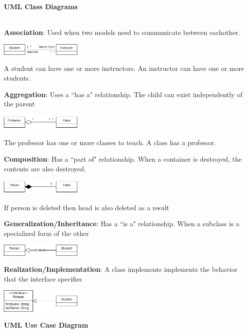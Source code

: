 \documentclass[8pt, letterpaper, titlepage]{article}
\begin{document}
\begin{multicols*}{3}
\textbf{UML Class Diagrams}

     \\
\textbf{Association}: Used when two models need to communicate between eachother.
\begin{center}
    \includegraphics[width=4cm]{uni.png}
\end{center}
A student can have one or more instructors. An instructor can have one or more students.

\textbf{Aggregation}:  Uses a ``has a" relationship. The child can exist independently of the parent
\begin{center}
\includegraphics[width=4cm]{aggregation.png}
\end{center}
The professor has one or more classes to teach. A class has a professor.

\textbf{Composition}: Has a ``part of" relationship. When a container is destroyed, the contents are also destroyed.
\begin{center}
    \includegraphics[width=4cm]{composition.png}
\end{center}
If person is deleted then head is also deleted as a result

\textbf{Generalization/Inheritance}: Has a ``is a" relationship. When a subclass is a specialized form of the other
\begin{center}
    \includegraphics[width=4cm]{Generalization.png}
\end{center}

\textbf{Realization/Implementation}: A class implements implements the behavior that the interface specifies
\begin{center}
    \includegraphics[width=4cm]{interface.png}
\end{center}
\vfill\null
\columnbreak
\textbf{UML Use Case Diagram}


\end{multicols*}
\end{document}
